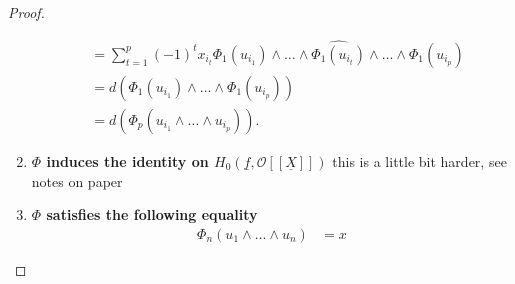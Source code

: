 \documentclass{article}
\theoremstyle{plain}%
\theoremstyle{definition}
\theoremstyle{remark}
\begin{document}
\begin{proof}
\begin{enumerate}
\begin{align*}
                &= \sum_{t=1}^p(-1)^t x_{i_t}\Phi_1(u_{i_1})\!\wedge\!\dots\!
                \wedge\widehat{\Phi_1(u_{i_t})}\!\wedge\!\dots\!\wedge\!\Phi_1(u_{i_p})\\
                &= d(\Phi_1(u_{i_1})\wedge\dots\wedge \Phi_1(u_{i_p}))\\
                &= d(\Phi_p(u_{i_1}\wedge\dots\wedge u_{i_p})).
            \end{align*}
            \item \textbf{\(\Phi\) induces the identity on \(H_0(\underline{f}, \mathcal{O}[[\underline{X}]])\)}
            this is a little bit harder, see notes on paper
            \item \textbf{\(\Phi\) satisfies the following equality}
            \begin{align*}
                \Phi_n(u_1 \wedge \dots \wedge u_n) &= x
            \end{align*}
        \end{enumerate}
    \end{proof}
\end{document}
